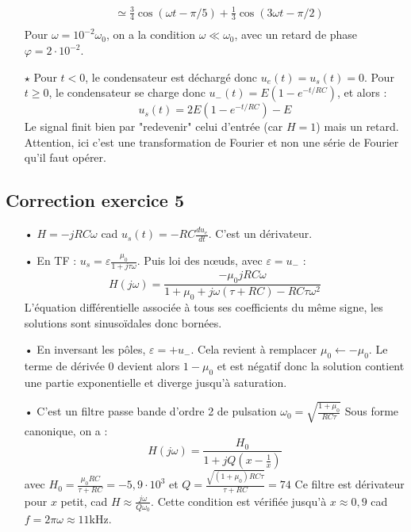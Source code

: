 \documentclass{report}
\begin{document}
\begin{itemize}
\begin{equation}
\begin{array}{lll}
		 & \simeq \frac{3}{4}\cos(\omega t - \pi/5) + \frac{1}{3}\cos(3\omega t - \pi/2)\\
	\end{array}
\end{equation}		
	Pour $\omega = 10^{-2}\omega_0$, on a la condition $\omega\ll\omega_0$, avec un retard de phase $\varphi = 2\cdot10^{-2}$.
	
	\item[$\star$] Pour $t<0$, le condensateur est déchargé donc $u_e(t)=u_s(t)=0$. Pour $t\geq0$, le condensateur se charge donc $u_-(t) = E(1-e^{-t/RC})$, et alors :
	\begin{equation}
		u_s(t)=2E(1-e^{-t/RC}) - E
	\end{equation}
	Le signal finit bien par "redevenir" celui d'entrée (car $H=1$) mais un retard. Attention, ici c'est une transformation de Fourier et non une série de Fourier qu'il faut opérer. 
	
\end{itemize}

\subsection*{Correction exercice 5}

\begin{itemize}
	\item[•] $H = -jRC\omega$ cad $u_s(t) = -RC\frac{du_e}{dt}$. C'est un dérivateur.
	\item[•] En TF : $u_s = \varepsilon\frac{\mu_0}{1+j\tau\omega}$. Puis loi des nœuds, avec $\varepsilon=u_-$ :
	\begin{equation}
		H(j\omega) = \frac{-\mu_0jRC\omega}{1+\mu_0 + j\omega(\tau+RC)-RC\tau\omega^2}
	\end{equation}
	L'équation différentielle associée à tous ses coefficients du même signe, les solutions sont sinusoïdales donc bornées. 
	\item[•] En inversant les pôles, $\varepsilon=+u_-$. Cela revient à remplacer $\mu_0\leftarrow-\mu_0$. Le terme de dérivée 0 devient alors $1-\mu_0$ et est négatif donc la solution contient une partie exponentielle et diverge jusqu'à saturation.
	\item[•] C'est un filtre passe bande d'ordre 2 de pulsation $\omega_0=\sqrt{\frac{1+\mu_0}{RC\tau}}$
	Sous forme canonique, on a :
		\begin{equation}
		H(j\omega) = \frac{H_0}{1+jQ(x-\frac{1}{x})}
	\end{equation}
	avec $H_0=\frac{\mu_0RC}{\tau+RC}=-5,9\cdot10^3$ et $Q = \frac{\sqrt{(1+\mu_0)RC\tau}}{\tau+RC}=74$
	Ce filtre est dérivateur pour $x$ petit, cad $H\approx \frac{j\omega}{Q\omega_0}$. Cette condition est vérifiée jusqu'à $x\approx0,9$ cad $f=2\pi\omega\approx11$kHz.
\end{itemize}
\end{document}
